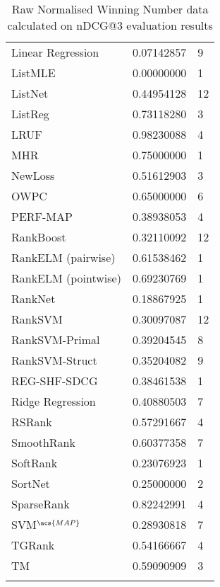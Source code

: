\begin{longtable}{l|l|l}
Linear Regression & 0.07142857 & 9 \\ 
List\acs{MLE} & 0.00000000 & 1 \\ 
ListNet & 0.44954128 & 12 \\ 
ListReg & 0.73118280 & 3 \\ 
LRUF & 0.98230088 & 4 \\ 
MHR & 0.75000000 & 1 \\ 
NewLoss & 0.51612903 & 3 \\ 
OWPC & 0.65000000 & 6 \\ 
PERF-\acs{MAP} & 0.38938053 & 4 \\ 
RankBoost & 0.32110092 & 12 \\ 
RankELM (pairwise) & 0.61538462 & 1 \\ 
RankELM (pointwise) & 0.69230769 & 1 \\ 
RankNet & 0.18867925 & 1 \\ 
Rank\acs{SVM} & 0.30097087 & 12 \\ 
Rank\acs{SVM}-Primal & 0.39204545 & 8 \\ 
Rank\acs{SVM}-Struct & 0.35204082 & 9 \\ 
REG-SHF-SDCG & 0.38461538 & 1 \\ 
Ridge Regression & 0.40880503 & 7 \\ 
RSRank & 0.57291667 & 4 \\ 
SmoothRank & 0.60377358 & 7 \\ 
SoftRank & 0.23076923 & 1 \\ 
SortNet & 0.25000000 & 2 \\ 
SparseRank & 0.82242991 & 4 \\ 
\acs{SVM}$^{\acs{MAP}}$ & 0.28930818 & 7 \\ 
TGRank & 0.54166667 & 4 \\ 
TM & 0.59090909 & 3 \\
\caption{Raw Normalised Winning Number data calculated on \acs{nDCG}@3 evaluation results}
\label{tab:raw_data_norm_winnum_ndcg3}
\end{longtable}